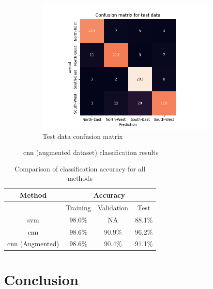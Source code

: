 \documentclass[10pt,twocolumn,letterpaper]{article}
\begin{document}
\begin{figure}
\begin{subfigure}{0.33\linewidth}
    \includegraphics[width=\linewidth, trim={7em, 0em, 9em, 5em}, clip]{cnn_aug_cfsn_test}
    \caption{Test data confusion matrix}
    \label{fig:cnn_test}
  \end{subfigure}
  \caption{\acrshort{cnn} (augmented dataset) classification results}
  \label{fig:cnn_aug_res}
\end{figure}

\begin{table}[H]
  \centering
  \begin{tabular}{*4c}
    \toprule
    Method & \multicolumn{3}{c}{Accuracy} \\
    \midrule
    {} & Training & Validation & Test \\
    \acrshort{svm} & 98.0\% & NA & 88.1\% \\
    \acrshort{cnn} & 98.6\% & 90.9\% & 96.2\% \\
    \acrshort{cnn} (Augmented) & 98.6\% & 90.4\% & 91.1\% \\
    \bottomrule
  \end{tabular}
  \caption{Comparison of classification accuracy for all methods}
  \label{tab:accuracy}
\end{table}



\section{Conclusion}
\label{sec:conclusion}


{\small


}
\end{document}
